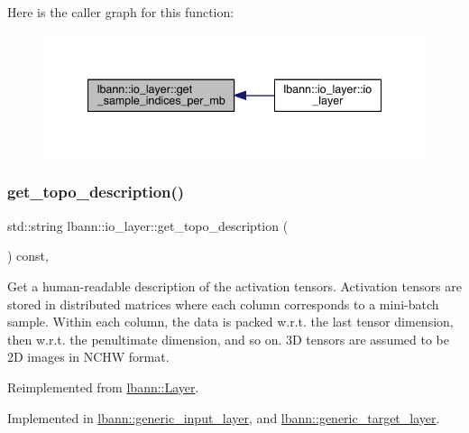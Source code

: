 Here is the caller graph for this function\+:\nopagebreak
\begin{figure}[H]
\begin{center}
\leavevmode
\includegraphics[width=340pt]{classlbann_1_1io__layer_ab319ad5697e002072ee03e8c64523fb5_icgraph}
\end{center}
\end{figure}
\mbox{\label{classlbann_1_1io__layer_a955ab7100591d07d0758e8f95c6e50be}} 
\subsubsection{\texorpdfstring{get\+\_\+topo\+\_\+description()}{get\_topo\_description()}}
{\footnotesize\ttfamily std\+::string lbann\+::io\+\_\+layer\+::get\+\_\+topo\+\_\+description (\begin{DoxyParamCaption}{ }\end{DoxyParamCaption}) const\hspace{0.3cm}{\ttfamily [override]}, {}}

Get a human-\/readable description of the activation tensors. Activation tensors are stored in distributed matrices where each column corresponds to a mini-\/batch sample. Within each column, the data is packed w.\+r.\+t. the last tensor dimension, then w.\+r.\+t. the penultimate dimension, and so on. 3D tensors are assumed to be 2D images in N\+C\+HW format. 

Reimplemented from \hyperlink{classlbann_1_1Layer_a147a7f7dcf0027a60f10109439e5dcea}{lbann\+::\+Layer}.



Implemented in \hyperlink{classlbann_1_1generic__input__layer_a36d9962105ca89889e3f38f1c1801560}{lbann\+::generic\+\_\+input\+\_\+layer}, and \hyperlink{classlbann_1_1generic__target__layer_ad6ea9a43254664c75aa06e8e5c1d7e8c}{lbann\+::generic\+\_\+target\+\_\+layer}.

